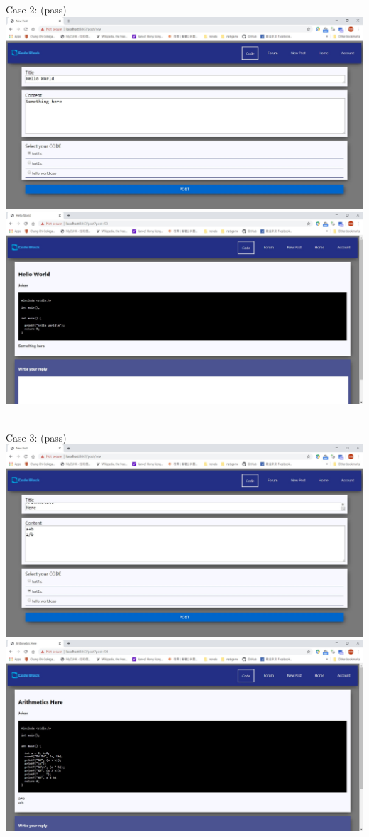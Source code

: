Case 2: (pass)\\
\includegraphics[scale=0.45]{Doc/Pics/case-8-1-2-1}\\
\includegraphics[scale=0.45]{Doc/Pics/case-8-1-2-2}\\

~

Case 3: (pass)\\
\includegraphics[scale=0.45]{Doc/Pics/case-8-1-3-1}\\
\includegraphics[scale=0.45]{Doc/Pics/case-8-1-3-2}\\

